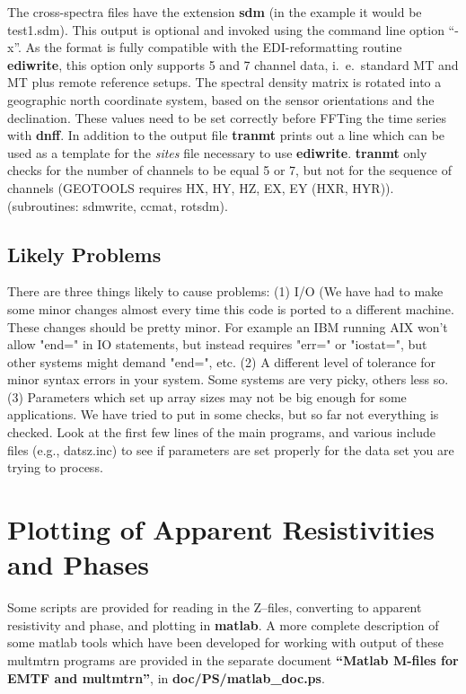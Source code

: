 The cross-spectra files have the extension {\bf sdm} (in the example
it would be test1.sdm). This output is optional and invoked using
the command line option ``-x''. As the format is fully compatible with
the EDI-reformatting routine {\bf ediwrite}, this option only supports
5 and 7 channel data, i.~e.~standard MT and MT plus remote reference
setups. The spectral density matrix is rotated into a geographic north
coordinate system, based on the sensor orientations and the
declination. These values need to be set correctly before FFTing the
time series with {\bf dnff}. In addition to the output file {\bf
tranmt} prints out a 
line which can be used as a template for the {\it sites} file
necessary to use {\bf ediwrite}. {\bf tranmt} only checks for the
number of channels to be equal 5 or 7, but not for the sequence of
channels (GEOTOOLS requires HX, HY, HZ, EX, EY (HXR,
HYR)). (subroutines: sdmwrite, ccmat, rotsdm). 

\subsection{\bf Likely Problems}

There are three things likely to cause problems: (1) I/O (We have had
to make some minor changes almost every time this code is
ported to a different machine.  These changes
should be pretty minor.  For example
an IBM running AIX
won't allow "end=" in IO statements, but instead requires "err="
or "iostat=", but other systems might demand "end=", etc.
(2) A different level of tolerance for minor syntax errors in your system.
Some systems are very picky, others less so.
(3)  Parameters which set up array sizes may
not be big enough for some applications.
We have tried to put in some checks, but so far not everything is checked.
Look at the first few lines of the main programs, and various include
files (e.g., datsz.inc) to see if parameters are
set properly for the data set you are trying to process.

\section{\bf Plotting of Apparent Resistivities and Phases}

Some scripts are provided for reading in the Z--files,
converting to apparent resistivity and 
phase, and plotting in {\bf matlab}.
A more complete description of some matlab tools
which have been developed for working with output of these
multmtrn programs are provided in the separate document
{\bf ``Matlab M-files for EMTF and multmtrn''}, in
{\bf doc/PS/matlab\_doc.ps}.

